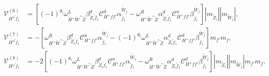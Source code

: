 \documentclass[final,3p,times]{elsarticle}
\begin{document}
\begin{align}
\mathcal{V}_{H^{\pm} \tilde{f}_1}^{(6)} &= [(-1)^{\theta_i} \omega_{H^+ \tilde{W}^+ \tilde{Z}}^L \beta_{\tilde{Z}_i \tilde{f}_1}^{d} \mathcal{C}_{H^+ f f'}^d \alpha_{\tilde{f}_1}^{\tilde{W}_j} - \omega_{H^+ \tilde{W}^+ \tilde{Z}}^R \alpha_{\tilde{Z}_i \tilde{f}_1}^{d} \mathcal{C}_{H^+ f f'}^u \beta_{\tilde{f}_1}^{\tilde{W}_j}]|m_{\tilde{Z}_i}||m_{\tilde{W}_j}|, \\
\mathcal{V}_{H^{\pm} \tilde{f}_1}^{(7)} &= -[\omega_{H^+ \tilde{W}^+ \tilde{Z}}^R \beta_{\tilde{Z}_i \tilde{f}_1}^{d} \mathcal{C}_{H^+ f f'}^u \alpha_{\tilde{f}_1}^{\tilde{W}_j} - (-1)^{\theta_i} \omega_{H^+ \tilde{W}^+ \tilde{Z}}^L \alpha_{\tilde{Z}_i \tilde{f}_1}^{d} \mathcal{C}_{H^+ f f'}^d \beta_{\tilde{f}_1}^{\tilde{W}_j}]m_{f'}m_{f}, \\
\mathcal{V}_{H^{\pm} \tilde{f}_1}^{(8)} &= -2[(-1)^{\theta_i} \omega_{H^+ \tilde{W}^+ \tilde{Z}}^L \beta_{\tilde{Z}_i \tilde{f}_1}^{d} \mathcal{C}_{H^+ f f'}^u \alpha_{\tilde{f}_1}^{\tilde{W}_j} - \omega_{H^+ \tilde{W}^+ \tilde{Z}}^R \alpha_{\tilde{Z}_i \tilde{f}_1}^{d} \mathcal{C}_{H^+ f f'}^d \beta_{\tilde{f}_1}^{\tilde{W}_j}]|m_{\tilde{Z}_i}||m_{\tilde{W}_j}|m_{f'}m_{f}.
\end{align}
\end{document}
